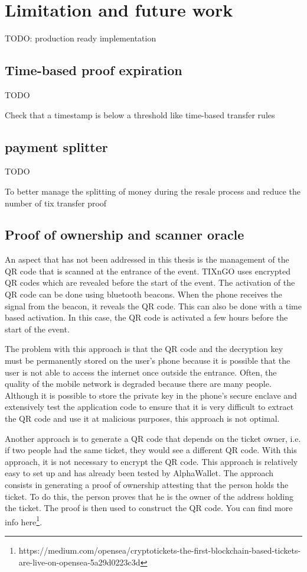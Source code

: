 \documentclass[a4paper,11pt,oneside]{report}
\begin{document}
\chapter{Limitation and future work}

TODO: production ready implementation

\section{Time-based proof expiration}
TODO

Check that a timestamp is below a threshold like time-based transfer rules

\section{payment splitter}
TODO

To better manage the splitting of money during the resale process and reduce the number of tix transfer proof

\section{Proof of ownership and scanner oracle}
An aspect that has not been addressed in this thesis is the management of the QR code that is scanned at the entrance of the event. TIXnGO uses encrypted QR codes which are revealed before the start of the event. The activation of the QR code can be done using bluetooth beacons. When the phone receives the signal from the beacon, it reveals the QR code. This can also be done with a time based activation. In this case, the QR code is activated a few hours before the start of the event.

The problem with this approach is that the QR code and the decryption key must be permanently stored on the user's phone because it is possible that the user is not able to access the internet once outside the entrance. Often, the quality of the mobile network is degraded because there are many people. Although it is possible to store the private key in the phone's secure enclave and extensively test the application code to ensure that it is very difficult to extract the QR code and use it at malicious purposes, this approach is not optimal.

Another approach is to generate a QR code that depends on the ticket owner, i.e. if two people had the same ticket, they would see a different QR code. With this approach, it is not necessary to encrypt the QR code. This approach is relatively easy to set up and has already been tested by AlphaWallet. The approach consists in generating a proof of ownership attesting that the person holds the ticket. To do this, the person proves that he is the owner of the address holding the ticket. The proof is then used to construct the QR code. You can find more info here\footnote{https://medium.com/opensea/cryptotickets-the-first-blockchain-based-tickets-are-live-on-opensea-5a29d0223c3d}.
\end{document}
